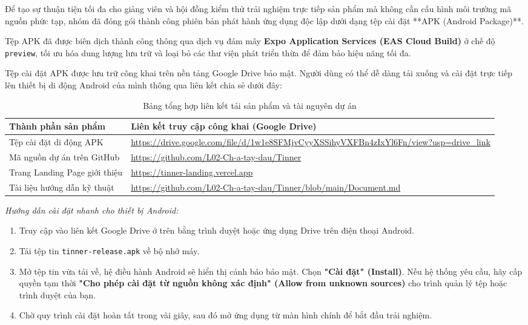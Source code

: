 Để tạo sự thuận tiện tối đa cho giảng viên và hội đồng kiểm thử trải nghiệm trực tiếp sản phẩm mà không cần cấu hình môi trường mã nguồn phức tạp, nhóm đã đóng gói thành công phiên bản phát hành ứng dụng độc lập dưới dạng tệp cài đặt **APK (Android Package)**.

Tệp APK đã được biên dịch thành công thông qua dịch vụ đám mây \textbf{Expo Application Services (EAS Cloud Build)} ở chế độ \texttt{preview}, tối ưu hóa dung lượng lưu trữ và loại bỏ các thư viện phát triển thừa để đảm bảo hiệu năng tối đa.

Tệp cài đặt APK được lưu trữ công khai trên nền tảng Google Drive bảo mật. Người dùng có thể dễ dàng tải xuống và cài đặt trực tiếp lên thiết bị di động Android của mình thông qua liên kết chia sẻ dưới đây:

\begin{table}[H]
\centering
\begin{tabular}{|p{5.5cm}|p{9.5cm}|}
\hline
\textbf{Thành phần sản phẩm} & \textbf{Liên kết truy cập công khai (Google Drive)} \\ \hline
Tệp cài đặt di động APK & \url{https://drive.google.com/file/d/1w1e8SFMjvCyyXSSihyVXFBn4zIxYl6Fn/view?usp=drive_link} \\ \hline
Mã nguồn dự án trên GitHub & \url{https://github.com/L02-Ch-a-tay-dau/Tinner} \\ \hline
Trang Landing Page giới thiệu & \url{https://tinner-landing.vercel.app} \\ \hline
Tài liệu hướng dẫn kỹ thuật & \url{https://github.com/L02-Ch-a-tay-dau/Tinner/blob/main/Document.md} \\ \hline
\end{tabular}
\caption{Bảng tổng hợp liên kết tải sản phẩm và tài nguyên dự án}
\end{table}

\textit{Hướng dẫn cài đặt nhanh cho thiết bị Android:}
\begin{enumerate}
    \item Truy cập vào liên kết Google Drive ở trên bằng trình duyệt hoặc ứng dụng Drive trên điện thoại Android.
    \item Tải tệp tin \texttt{tinner-release.apk} về bộ nhớ máy.
    \item Mở tệp tin vừa tải về, hệ điều hành Android sẽ hiển thị cảnh báo bảo mật. Chọn \textbf{"Cài đặt" (Install)}. Nếu hệ thống yêu cầu, hãy cấp quyền tạm thời \textbf{"Cho phép cài đặt từ nguồn không xác định" (Allow from unknown sources)} cho trình quản lý tệp hoặc trình duyệt của bạn.
    \item Chờ quy trình cài đặt hoàn tất trong vài giây, sau đó mở ứng dụng từ màn hình chính để bắt đầu trải nghiệm.
\end{enumerate}

